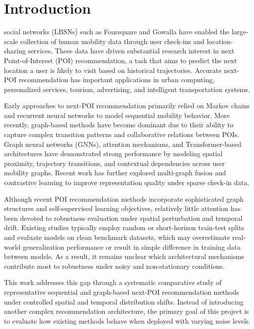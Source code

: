 \documentclass[12pt, journal]{IEEEtran}
\begin{document}
\section{Introduction}
 social networks (LBSNs) such as Foursquare and Gowalla have enabled the large-scale collection of human mobility data through user check-ins and location-sharing services. These data have driven substantial research interest in next Point-of-Interest (POI) recommendation, a task that aims to predict the next location a user is likely to visit based on historical trajectories. Accurate next-POI recommendation has important applications in urban computing, personalized services, tourism, advertising, and intelligent transportation systems.

Early approaches to next-POI recommendation primarily relied on Markov chains and recurrent neural networks to model sequential mobility behavior. More recently, graph-based methods have become dominant due to their ability to capture complex transition patterns and collaborative relations between POIs. Graph neural networks (GNNs), attention mechanisms, and Transformer-based architectures have demonstrated strong performance by modeling spatial proximity, trajectory transitions, and contextual dependencies across user mobility graphs. Recent work has further explored multi-graph fusion and contrastive learning to improve representation quality under sparse check-in data.

Although recent POI recommendation methods incorporate sophisticated graph structures and self-supervised learning objectives, relatively little attention has been devoted to robustness evaluation under spatial perturbation and temporal drift. Existing studies typically employ random or short-horizon train-test splits and evaluate models on clean benchmark datasets, which may overestimate real-world generalization performance or result in simple difference in training data between models. As a result, it remains unclear which architectural mechanisms contribute most to robustness under noisy and non-stationary conditions.

This work addresses this gap through a systematic comparative study of representative sequential and graph-based next-POI recommendation methods under controlled spatial and temporal distribution shifts. Instead of introducing another complex recommendation architecture, the primary goal of this project is to evaluate how existing methods behave when deployed with varying noise levels.
\end{document}
